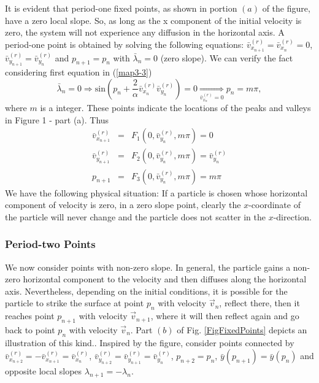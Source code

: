 \documentclass[reprint, aps, pre,nofootinbib]{revtex4-1}
\begin{document}
It is evident that period-one fixed points, as shown in portion $(a)$
of the figure, have a zero local slope. So, as long as the x component
of the initial velocity is zero, the system will not experience any
diffusion in the horizontal axis. A period-one point is obtained by
solving the following equations: $\bar{v}_{x_{n+1}}^{(r)}=\bar{v}_{x_{n}}^{(r)}=0$,
$\bar{v}_{y_{n+1}}^{(r)}=\bar{v}_{y_{n}}^{(r)}$ and $p_{n+1}=p_{n}$
with $\bar{\lambda}_{n}=0$ (zero slope). We can verify the fact considering
first equation in (\ref{map3-3})
\[
\bar{\lambda}_{n}=0\Rightarrow\textrm{sin}\left(p_{n}+\frac{2}{\alpha}\bar{v}_{x_{n}}^{(r)}\bar{v}_{y_{n}}^{(r)}\right)=0\underset{\bar{v}_{x_{n}}^{(r)}=0}{\Rightarrow}p_{n}=m\pi,
\]
where $m$ is a integer. These points indicate the locations of the
peaks and valleys in Figure 1 - part (a). Thus
\begin{eqnarray}
\bar{v}_{x_{n+1}}^{(r)} & = & F_{1}\left(0,\bar{v}_{y_{n}}^{(r)},m\pi\right)=0\nonumber \\
\bar{v}_{y_{n+1}}^{(r)} & = & F_{2}\left(0,\bar{v}_{y_{n}}^{(r)},m\pi\right)=\bar{v}_{y_{n}}^{(r)}\label{peri1}\\
p_{n+1} & = & F_{3}\left(0,\bar{v}_{y_{n}}^{(r)},m\pi\right)=m\pi\nonumber 
\end{eqnarray}
We have the following physical situation: If a particle is chosen
whose horizontal component of velocity is zero, in a zero slope point,
clearly the $x$-coordinate of the particle will never change and
the particle does not scatter in the $x$-direction. 

\subsubsection{Period-two Points}

We now consider points with non-zero slope. In general, the particle
gains a non-zero horizontal component to the velocity and then diffuses
along the horizontal axis. Nevertheless, depending on the initial
conditions, it is possible for the particle to strike the surface
at point $p_{n}$ with velocity $\vec{v}_{n}$, reflect there, then
it reaches point $p_{n+1}$ with velocity $\vec{v}_{n+1}$, where
it will then reflect again and go back to point $p_{n}$ with velocity
$\vec{v}_{n}$. Part $(b)$ of Fig. \ref{FigFixedPoints} depicts
an illustration of this kind.. Inspired by the figure, consider points
connected by $\bar{v}_{x_{n+2}}^{(r)}=-\bar{v}_{x_{n+1}}^{(r)}=\bar{v}_{x_{n}}^{(r)}$,
$\bar{v}_{y_{n+2}}^{(r)}=\bar{v}_{y_{n+1}}^{(r)}=\bar{v}_{y_{n}}^{(r)}$,
$p_{n+2}=p_{n}$, $\bar{y}(p_{n+1})=\bar{y}(p_{n})$ and opposite
local slopes $\lambda_{n+1}=-\lambda_{n}$. 
\end{document}
